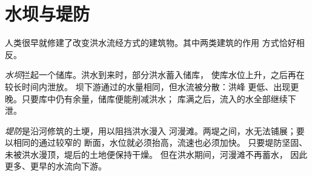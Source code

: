 \section{水坝与堤防}

人类很早就修建了改变洪水流经方式的建筑物。其中两类建筑的作用
方式恰好相反。

\emph{水坝}拦起一个储库。洪水到来时，部分洪水蓄入储库，
使库水位上升，之后再在较长时间内泄放。
坝下游通过的水量相同，但水流被分散：洪峰
更低、出现更晚。只要库中仍有余量，储库便能削减洪水；
库满之后，流入的水全部继续下泄。

\emph{堤防}是沿河修筑的土埂，用以阻挡洪水漫入
河漫滩。两堤之间，水无法铺展；要以相同的通过较窄的
断面，水位就必须抬高，流速也必须加快。
只要堤防坚固、未被洪水漫顶，堤后的土地便保持干燥。
但在洪水期间，河漫滩不再蓄水，
因此更多、更早的水流向下游。

